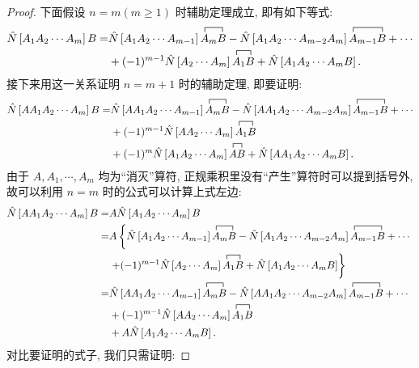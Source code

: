 \begin{proof}
下面假设 $n=m(m \geqslant 1)$ 时辅助定理成立, 即有如下等式:
\begin{align}
\hat{N}\left[A_{1} A_{2} \cdots A_{m}\right] B=& \hat{N}\left[A_{1} A_{2} \cdots A_{m-1}\right] \contraction{}{A}{_{m}}{B}{A_{m} B}-\hat{N}\left[A_{1} A_{2} \cdots A_{m-2} A_{m}\right] \contraction{}{A}{_{m-1}}{B}A_{m-1} B+\cdots \nonumber\\
&+(-1)^{m-1} \hat{N}\left[A_{2} \cdots A_{m}\right] \contraction{}{A}{_{1}}{B}{A_{1} B}+\hat{N}\left[A_{1} A_{2} \cdots A_{m} B\right] .
\end{align}
接下来用这一关系证明 $n=m+1$ 时的辅助定理, 即要证明:
\begin{align}
\hat{N}\left[A A_{1} A_{2} \cdots A_{m}\right] B=& \hat{N}\left[A A_{1} A_{2} \cdots A_{m-1}\right] \contraction{}{A}{_{m}}{B}{A_{m} B}-\hat{N}\left[A A_{1} A_{2} \cdots A_{m-2} A_{m}\right] \contraction{}{A}{_{m-1}}{B}A_{m-1} B+\cdots \nonumber\\
&+(-1)^{m-1} \hat{N}\left[A A_{2} \cdots A_{m}\right] \contraction{}{A}{_{1}}{B}{A_{1} B}\nonumber \\
&+(-1)^{m} \hat{N}\left[A_{1} A_{2} \cdots A_{m}\right]\contraction{}{A}{}{B} {A B}+\hat{N}\left[A A_{1} A_{2} \cdots A_{m} B\right] .
\end{align}
由于 $A,A_1,\cdots,A_m$ 均为“消灭”算符, 正规乘积里没有“产生”算符时可以提到括号外, 故可以利用 $n=m$ 时的公式可以计算上式左边:
\begin{align}
\hat{N}\left[A A_{1} A_{2} \cdots A_{m}\right] B=& A \hat{N}\left[A_{1} A_{2} \cdots A_{m}\right] B \nonumber\\
=& A\left\{\hat{N}\left[A_{1} A_{2} \cdots A_{m-1}\right] \contraction{}{A}{_{m}}{B}{A_{m} B}-\hat{N}\left[A_{1} A_{2} \cdots A_{m-2} A_{m}\right]\contraction{}{A}{_{m-1}}{B} A_{m-1} B+\cdots\right.\nonumber\\
&\left.+(-1)^{m-1} \hat{N}\left[A_{2} \cdots A_{m}\right] \contraction{}{A}{_{1}}{B}A_{1} B+\hat{N}\left[A_{1} A_{2} \cdots A_{m} B\right]\right\}\nonumber \\
=& \hat{N}\left[A A_{1} A_{2} \cdots A_{m-1}\right] \contraction{}{A}{_{m}}{B}{A_{m} B}-\hat{N}\left[A A_{1} A_{2} \cdots A_{m-2} A_{m}\right]\contraction{}{A}{_{m-1}}{B} A_{m-1} B+\cdots \nonumber\\
&+(-1)^{m-1} \hat{N}\left[A A_{2} \cdots A_{m}\right] \contraction{}{A}{_{1}}{B}{A_{1} B} \nonumber\\
&+A \hat{N}\left[A_{1} A_{2} \cdots A_{m} B\right].
\end{align}
对比要证明的式子, 我们只需证明:

\end{proof}
